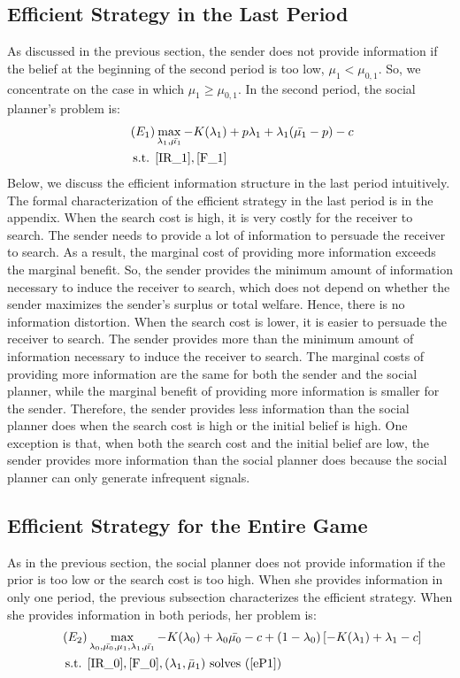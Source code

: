 \documentclass[11pt]{extarticle}
\begin{document}
\subsection{Efficient Strategy in the Last Period}
As discussed in the previous section, the sender does not provide information if the belief at the beginning of the second period is too low, $\mu_1 < \mu_{0,1}$. So, we concentrate on the case in which $\mu_1 \geq \mu_{0,1}$. In the second period, the social planner's problem is:
\begin{align}\tag{$E_1$} \label{eP1}
& \max\limits_{\lambda_1, \bar{\mu_1}} -K(\lambda_1) + p \lambda_1 + \lambda_1(\bar{\mu_1} - p) - c \nonumber\\
\text{s.t. } &\eqref{IR_1},\eqref{F_1} \nonumber
\end{align}
Below, we discuss the efficient information structure in the last period intuitively. The formal characterization of the efficient strategy in the last period is in the appendix. When the search cost is high, %
it is very costly for the receiver to search. The sender needs to provide a lot of information to persuade the receiver to search. As a result, the marginal cost of providing more information exceeds the marginal benefit. So, the sender provides the minimum amount of information necessary to induce the receiver to search, which does not depend on whether the sender maximizes the sender's surplus or total welfare. Hence, there is no information distortion. When the search cost is lower, %
it is easier to persuade the receiver to search. The sender provides more than the minimum amount of information necessary to induce the receiver to search. The marginal costs of providing more information are the same for both the sender and the social planner, while the marginal benefit of providing more information is smaller for the sender. Therefore, the sender provides less information than the social planner does when the search cost is high or the initial belief is high. One exception is that, when both the search cost and the initial belief are low, %
the sender provides more information than the social planner does because the social planner can only generate infrequent signals.


\subsection{Efficient Strategy for the Entire Game}
As in the previous section, the social planner does not provide information if the prior is too low or the search cost is too high. When she provides information in only one period, the previous subsection characterizes the efficient strategy. When she provides information in both periods, her problem is:
\begin{align}\tag{$E_2$} \label{eP2}
& \max\limits_{\lambda_0, \bar{\mu_0}, \mu_1, \lambda_1, \bar{\mu_1}} -K(\lambda_0) + \lambda_0 \bar{\mu_0} - c + (1-\lambda_0) \left[-K(\lambda_1)+\lambda_1-c\right] \nonumber\\
\text{s.t. } &\eqref{IR_0},\eqref{F_0},(\lambda_1,\bar{\mu}_1) \text{ solves (\ref{eP1})} \nonumber
\end{align}
\end{document}

